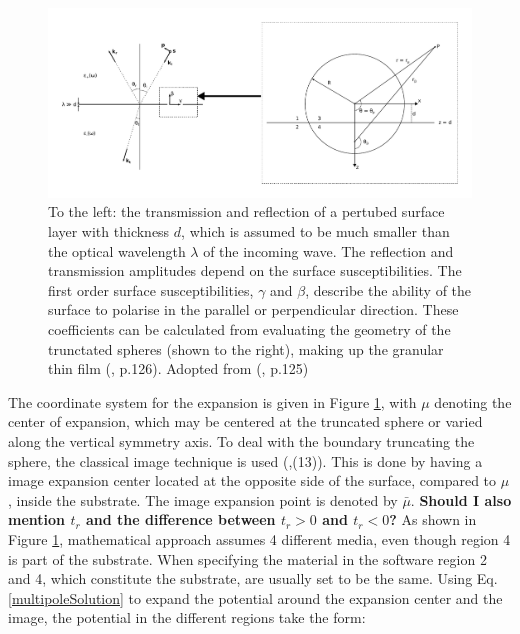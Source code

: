 \begin{figure}[h!]
  \centering
   \includegraphics[width=1.0\textwidth]{Figures/filmGeometry.pdf}
   \caption{To the left: the transmission and reflection of a pertubed surface layer with thickness $d$, 
      which is assumed to be much smaller than the optical wavelength $\lambda$ of the incoming wave.
      The reflection and transmission amplitudes depend on the surface 
      susceptibilities. The first order surface susceptibilities, $\gamma$ and $\beta$, describe
      the ability of the surface to polarise in the parallel or perpendicular direction. These
      coefficients can be calculated from evaluating the geometry of the trunctated spheres
      (shown to the right), making up
      the granular thin film (\cite{Lazzari2002}, p.126). Adopted from (\cite{Lazzari2002}, p.125)
   }
   \label{fig:filmGeometry}
\end{figure}
%
The coordinate system for the expansion is given in Figure \ref{fig:filmGeometry}, with $\mu$ denoting 
the center of expansion, which may be centered at the truncated sphere or varied along the vertical
symmetry axis. To deal with the boundary truncating the sphere, the classical image technique is used 
(\cite{Lazzari2002},(13)). This is done by having a image expansion center located at 
the opposite side of the surface, compared to $\mu$, inside the substrate.
The image expansion point is denoted by $\bar{\mu}$. 
%
\textbf{Should I also mention $t_r$ and the difference between $t_r > 0$ and $t_r < 0$?}
%
As shown in Figure \ref{fig:filmGeometry}, mathematical approach assumes 4 different media,
even though region 4 is part of the substrate. When specifying the material in the software
region 2 and 4, which constitute the substrate, are usually set to be the same.
Using Eq.\eqref{multipoleSolution} to expand the potential around the expansion center and 
the image, the potential in the different regions take the form:
%
